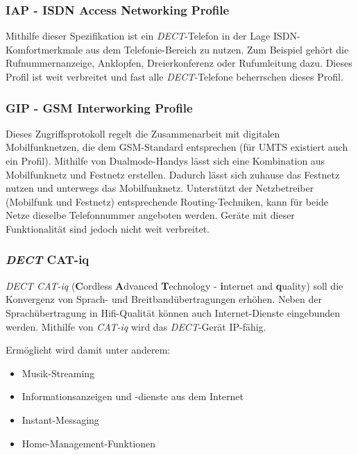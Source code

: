 \begin{multicols}{3}

\subsubsection*{IAP - ISDN Access Networking Profile}
Mithilfe dieser Spezifikation ist ein \textit{DECT}-Telefon in der Lage ISDN-Komfortmerkmale aus dem Telefonie-Bereich zu nutzen. Zum Beispiel gehört die Rufnummernanzeige, Anklopfen, Dreierkonferenz oder Rufumleitung dazu. Dieses Profil ist weit verbreitet und fast alle \textit{DECT}-Telefone beherrschen dieses Profil. \cite{dect.1}

\subsubsection*{GIP - GSM Interworking Profile}
Dieses Zugriffsprotokoll regelt die Zusammenarbeit mit digitalen Mobilfunknetzen, die dem GSM-Standard entsprechen (für UMTS existiert auch ein Profil). Mithilfe von Dualmode-Handys lässt sich eine Kombination aus Mobilfunknetz und Festnetz erstellen. Dadurch lässt sich zuhause das Festnetz nutzen und unterwegs das Mobilfunknetz. Unterstützt der Netzbetreiber (Mobilfunk und Festnetz) entsprechende Routing-Techniken, kann für beide Netze dieselbe Telefonnummer angeboten werden. Geräte mit dieser Funktionalität sind jedoch nicht weit verbreitet. \cite{dect.1}
\subsubsection*{\textit{DECT} CAT-iq}
\textit{DECT CAT-iq} (\textbf{C}ordless \textbf{A}dvanced \textbf{T}echnology - \textbf{i}nternet and \textbf{q}uality) soll die Konvergenz von Sprach- und Breitbandübertragungen erhöhen. Neben der Sprachübertragung in Hifi-Qualität können auch Internet-Dienste eingebunden werden. Mithilfe von \textit{CAT-iq} wird das \textit{DECT}-Gerät IP-fähig.

Ermöglicht wird damit unter anderem:
\begin{itemize}
\item Musik-Streaming
\item Informationsanzeigen und -dienste aus dem Internet
\item Instant-Messaging 
\item Home-Management-Funktionen
\end{itemize}


\end{multicols}

